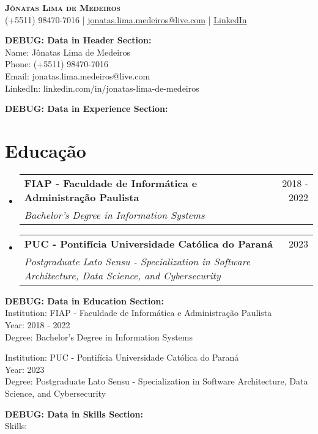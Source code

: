 \documentclass[letterpaper,11pt]{article}
\makeatletter
\newcommand{\resumeSubheading}[4]{
  \vspace{-2pt}\item
    \begin{tabular*}{0.97\textwidth}[t]{l@{\extracolsep{\fill}}r}
      \textbf{#1} & #2 \\
      \textit{\small#3} & \textit{\small #4} \\
    \end{tabular*}\vspace{-7pt}
}
\newcommand{\resumeSubHeadingListStart}{\begin{itemize}[leftmargin=0.15in, label={}]}
\newcommand{\resumeSubHeadingListEnd}{\end{itemize}}
\makeatother
\begin{document}
\begin{center}
  \textbf{\Huge \scshape Jônatas Lima de Medeiros } \\
  \small (+5511) 98470-7016 | \href{mailto:jonatas.lima.medeiros@live.com }{\underline{jonatas.lima.medeiros@live.com}} | \href{linkedin.com/in/jonatas-lima-de-medeiros }{\underline{LinkedIn}}
\end{center}

\textbf{DEBUG: Data in Header Section:} \\
Name: Jônatas Lima de Medeiros \\
Phone: (+5511) 98470-7016 \\
Email: jonatas.lima.medeiros@live.com \\
LinkedIn: linkedin.com/in/jonatas-lima-de-medeiros



\textbf{DEBUG: Data in Experience Section:} \\




\section{Educação}

  \resumeSubHeadingListStart
  
    \resumeSubheading
      {FIAP - Faculdade de Informática e Administração Paulista}{2018 - 2022}{Bachelor's Degree in Information Systems}{}
  
    \resumeSubheading
      {PUC - Pontifícia Universidade Católica do Paraná}{2023}{Postgraduate Lato Sensu - Specialization in Software Architecture, Data Science, and Cybersecurity}{}
  
  \resumeSubHeadingListEnd


\textbf{DEBUG: Data in Education Section:} \\

  Institution: FIAP - Faculdade de Informática e Administração Paulista \\
  Year: 2018 - 2022 \\
  Degree: Bachelor's Degree in Information Systems

  Institution: PUC - Pontifícia Universidade Católica do Paraná \\
  Year: 2023 \\
  Degree: Postgraduate Lato Sensu - Specialization in Software Architecture, Data Science, and Cybersecurity




\textbf{DEBUG: Data in Skills Section:} \\
Skills: 
\end{document}
